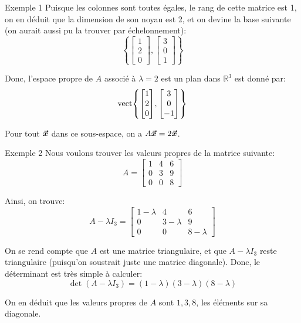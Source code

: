 \documentclass[a4paper]{article}
\begin{document}
\begin{parag}{Exemple 1}
    Puisque les colonnes sont toutes égales, le rang de cette matrice est 1, on en déduit que la dimension de son noyau est 2, et on devine la base suivante (on aurait aussi pu la trouver par échelonnement): 
    \[\left\{\begin{bmatrix} 1 \\ 2 \\ 0 \end{bmatrix}, \begin{bmatrix} 3 \\ 0 \\ 1 \end{bmatrix} \right\}\]

    Donc, l'espace propre de $A$ associé à $\lambda = 2$ est un plan dans $\mathbb{R}^3$ est donné par: 
    \[\vect\left\{\begin{bmatrix} 1 \\ 2 \\ 0 \end{bmatrix}, \begin{bmatrix} 3 \\ 0 \\ -1 \end{bmatrix} \right\}\]
    
    Pour tout $\bm{\protect\vec{x}}$ dans ce sous-espace, on a $A \bm{\protect\vec{x}} = 2 \bm{\protect\vec{x}}$. 
\end{parag}

\begin{parag}{Exemple 2}
    Nous voulons trouver les valeurs propres de la matrice suivante: 
    \[A = \begin{bmatrix} 1 & 4 & 6 \\ 0 & 3 & 9 \\ 0 & 0 & 8 \end{bmatrix} \]
    
    Ainsi, on trouve: 
    \[A - \lambda I_3 = \begin{bmatrix} 1 - \lambda & 4 & 6 \\ 0 & 3-\lambda & 9 \\ 0 & 0 & 8-\lambda \end{bmatrix} \]
    

    On se rend compte que $A$ est une matrice triangulaire, et que $A - \lambda I_3$ reste triangulaire (puisqu'on soustrait juste une matrice diagonale). Donc, le déterminant est très simple à calculer:
    \[\det\left(A - \lambda I_3\right) = \left(1 - \lambda\right)\left(3 - \lambda\right)\left(8 - \lambda\right)\]
    
    On en déduit que les valeurs propres de $A$ sont $1, 3, 8$, les éléments sur sa diagonale.
\end{parag}
\end{document}
